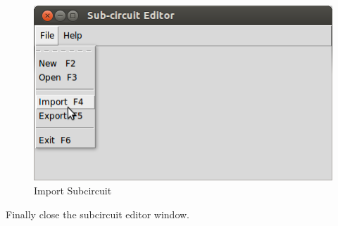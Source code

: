 \begin{figure}[t]%
\begin{center}
\includegraphics[width=0.5\linewidth]{figures/import-subckt.png}%
\caption{Import Subcircuit}
\label{import}
\end{center}
\end{figure}

Finally close the subcircuit editor window.









